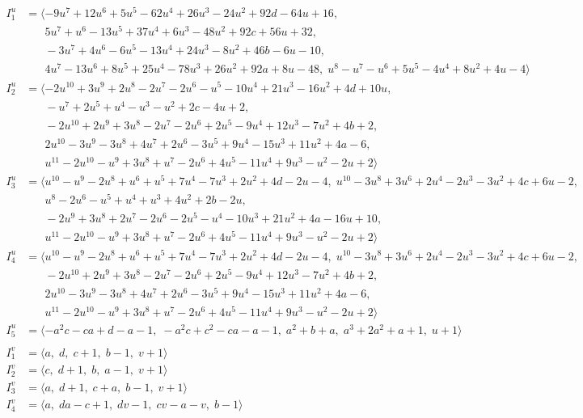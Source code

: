 \documentclass[1p]{elsarticle_modified}
\theoremstyle{definition}
\begin{document}
\begin{align*}
I^u_{1}&=\langle 
-9 u^7+12 u^6+5 u^5-62 u^4+26 u^3-24 u^2+92 d-64 u+16,\\
\phantom{I^u_{1}}&\phantom{= \langle  }5 u^7+u^6-13 u^5+37 u^4+6 u^3-48 u^2+92 c+56 u+32,\\
\phantom{I^u_{1}}&\phantom{= \langle  }-3 u^7+4 u^6-6 u^5-13 u^4+24 u^3-8 u^2+46 b-6 u-10,\\
\phantom{I^u_{1}}&\phantom{= \langle  }4 u^7-13 u^6+8 u^5+25 u^4-78 u^3+26 u^2+92 a+8 u-48,\;u^8- u^7- u^6+5 u^5-4 u^4+8 u^2+4 u-4\rangle \\
I^u_{2}&=\langle 
-2 u^{10}+3 u^9+2 u^8-2 u^7-2 u^6- u^5-10 u^4+21 u^3-16 u^2+4 d+10 u,\\
\phantom{I^u_{2}}&\phantom{= \langle  }- u^7+2 u^5+u^4- u^3- u^2+2 c-4 u+2,\\
\phantom{I^u_{2}}&\phantom{= \langle  }-2 u^{10}+2 u^9+3 u^8-2 u^7-2 u^6+2 u^5-9 u^4+12 u^3-7 u^2+4 b+2,\\
\phantom{I^u_{2}}&\phantom{= \langle  }2 u^{10}-3 u^9-3 u^8+4 u^7+2 u^6-3 u^5+9 u^4-15 u^3+11 u^2+4 a-6,\\
\phantom{I^u_{2}}&\phantom{= \langle  }u^{11}-2 u^{10}- u^9+3 u^8+u^7-2 u^6+4 u^5-11 u^4+9 u^3- u^2-2 u+2\rangle \\
I^u_{3}&=\langle 
u^{10}- u^9-2 u^8+u^6+u^5+7 u^4-7 u^3+2 u^2+4 d-2 u-4,\;u^{10}-3 u^8+3 u^6+2 u^4-2 u^3-3 u^2+4 c+6 u-2,\\
\phantom{I^u_{3}}&\phantom{= \langle  }u^8-2 u^6- u^5+u^4+u^3+4 u^2+2 b-2 u,\\
\phantom{I^u_{3}}&\phantom{= \langle  }-2 u^9+3 u^8+2 u^7-2 u^6-2 u^5- u^4-10 u^3+21 u^2+4 a-16 u+10,\\
\phantom{I^u_{3}}&\phantom{= \langle  }u^{11}-2 u^{10}- u^9+3 u^8+u^7-2 u^6+4 u^5-11 u^4+9 u^3- u^2-2 u+2\rangle \\
I^u_{4}&=\langle 
u^{10}- u^9-2 u^8+u^6+u^5+7 u^4-7 u^3+2 u^2+4 d-2 u-4,\;u^{10}-3 u^8+3 u^6+2 u^4-2 u^3-3 u^2+4 c+6 u-2,\\
\phantom{I^u_{4}}&\phantom{= \langle  }-2 u^{10}+2 u^9+3 u^8-2 u^7-2 u^6+2 u^5-9 u^4+12 u^3-7 u^2+4 b+2,\\
\phantom{I^u_{4}}&\phantom{= \langle  }2 u^{10}-3 u^9-3 u^8+4 u^7+2 u^6-3 u^5+9 u^4-15 u^3+11 u^2+4 a-6,\\
\phantom{I^u_{4}}&\phantom{= \langle  }u^{11}-2 u^{10}- u^9+3 u^8+u^7-2 u^6+4 u^5-11 u^4+9 u^3- u^2-2 u+2\rangle \\
I^u_{5}&=\langle 
- a^2 c- c a+d- a-1,\;- a^2 c+c^2- c a- a-1,\;a^2+b+a,\;a^3+2 a^2+a+1,\;u+1\rangle \\
\\
I^v_{1}&=\langle 
a,\;d,\;c+1,\;b-1,\;v+1\rangle \\
I^v_{2}&=\langle 
c,\;d+1,\;b,\;a-1,\;v+1\rangle \\
I^v_{3}&=\langle 
a,\;d+1,\;c+a,\;b-1,\;v+1\rangle \\
I^v_{4}&=\langle 
a,\;d a- c+1,\;d v-1,\;c v- a- v,\;b-1\rangle \\
\end{align*}
\end{document}
